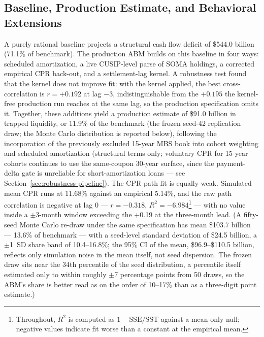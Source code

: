 \documentclass[12pt]{article}
\begin{document}
\subsection{Baseline, Production Estimate, and Behavioral Extensions}\label{sec:abm-results}

A purely rational baseline projects a structural cash flow deficit of \$544.0 billion (71.1\% of benchmark). The production ABM builds on this baseline in four ways: scheduled amortization, a live CUSIP-level parse of SOMA holdings, a corrected empirical CPR back-out, and a settlement-lag kernel. A robustness test found that the kernel does not improve fit: with the kernel applied, the best cross-correlation is $r = +0.192$ at lag $-3$, indistinguishable from the $+0.195$ the kernel-free production run reaches at the same lag, so the production specification omits it. Together, these additions yield a production estimate of \$91.0 billion in trapped liquidity, or 11.9\% of the benchmark (the frozen seed-42 replication draw; the Monte Carlo distribution is reported below), following the incorporation of the previously excluded 15-year MBS book into cohort weighting and scheduled amortization (structural terms only; voluntary CPR for 15-year cohorts continues to use the same-coupon 30-year surface, since the payment-delta gate is unreliable for short-amortization loans --- see Section~\ref{sec:robustness-pipeline}). The CPR path fit is equally weak. Simulated mean CPR runs at 11.68\% against an empirical 5.14\%, and the raw path correlation is negative at lag 0 --- $r = -0.318$, $R^2 = -6.984$\footnote{Throughout, $R^2$ is computed as $1-\mathrm{SSE}/\mathrm{SST}$ against a mean-only null; negative values indicate fit worse than a constant at the empirical mean.} --- with no value inside a $\pm$3-month window exceeding the +0.19 at the three-month lead. (A fifty-seed Monte Carlo re-draw under the same specification has mean \$103.7 billion --- 13.6\% of benchmark --- with a seed-level standard deviation of \$24.5 billion, a $\pm$1~SD share band of 10.4--16.8\%; the 95\% CI of the mean, \$96.9--\$110.5 billion, reflects only simulation noise in the mean itself, not seed dispersion. The frozen draw sits near the 34th percentile of the seed distribution, a percentile itself estimated only to within roughly $\pm$7 percentage points from 50 draws, so the ABM's share is better read as on the order of 10--17\% than as a three-digit point estimate.)
\end{document}
